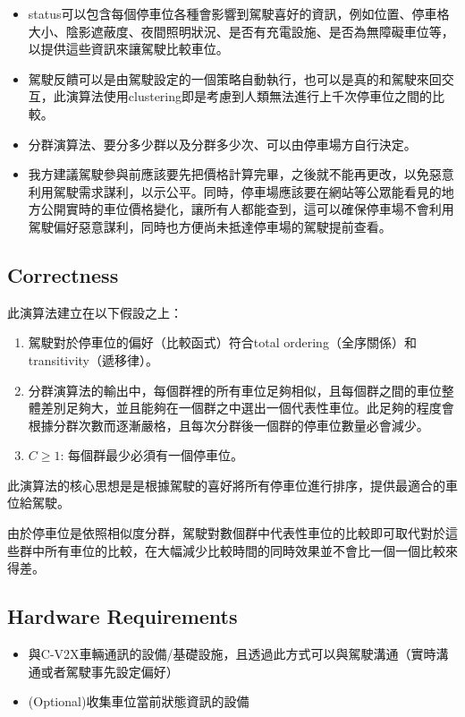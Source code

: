 \documentclass[sigconf,authorversion,nonacm,screen]{acmart}
\begin{document}
\begin{itemize}
    \item status可以包含每個停車位各種會影響到駕駛喜好的資訊，例如位置、停車格大小、陰影遮蔽度、夜間照明狀況、是否有充電設施、是否為無障礙車位等，以提供這些資訊來讓駕駛比較車位。
    \item 駕駛反饋可以是由駕駛設定的一個策略自動執行，也可以是真的和駕駛來回交互，此演算法使用clustering即是考慮到人類無法進行上千次停車位之間的比較。
    \item 分群演算法、要分多少群以及分群多少次、可以由停車場方自行決定。
    \item 我方建議駕駛參與前應該要先把價格計算完畢，之後就不能再更改，以免惡意利用駕駛需求謀利，以示公平。同時，停車場應該要在網站等公眾能看見的地方公開實時的車位價格變化，讓所有人都能查到，這可以確保停車場不會利用駕駛偏好惡意謀利，同時也方便尚未抵達停車場的駕駛提前查看。
\end{itemize}

\subsection{Correctness}

\quad 此演算法建立在以下假設之上：
\begin{enumerate}
    \item 駕駛對於停車位的偏好（比較函式）符合total ordering（全序關係）和transitivity（遞移律）。
    \item 分群演算法的輸出中，每個群裡的所有車位足夠相似，且每個群之間的車位整體差別足夠大，並且能夠在一個群之中選出一個代表性車位。此足夠的程度會根據分群次數而逐漸嚴格，且每次分群後一個群的停車位數量必會減少。
    \item $C \geq 1$: 每個群最少必須有一個停車位。
\end{enumerate}

此演算法的核心思想是是根據駕駛的喜好將所有停車位進行排序，提供最適合的車位給駕駛。

由於停車位是依照相似度分群，駕駛對數個群中代表性車位的比較即可取代對於這些群中所有車位的比較，在大幅減少比較時間的同時效果並不會比一個一個比較來得差。

\subsection{Hardware Requirements}

\begin{itemize}
    \item 與C-V2X車輛通訊的設備/基礎設施，且透過此方式可以與駕駛溝通（實時溝通或者駕駛事先設定偏好）
    \item (Optional)收集車位當前狀態資訊的設備
\end{itemize}
\end{document}
